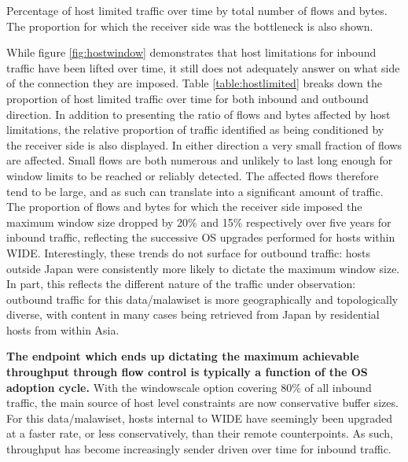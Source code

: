 \begin{table}\footnotesize
\centering
  \caption{\label{table:hostlimited}Percentage of host limited traffic over time by total number of flows and bytes. The proportion for which the receiver side was the bottleneck is also shown.}
\end{table}

While figure \ref{fig:hostwindow} demonstrates that host limitations for inbound traffic have been lifted over time, it still does not adequately answer on what side of the connection they are imposed.
Table \ref{table:hostlimited} breaks down the proportion of host limited traffic over time for both inbound and outbound direction.
In addition to presenting the ratio of flows and bytes affected by host limitations, the relative proportion of traffic identified as being conditioned by the receiver side is also displayed.
In either direction a very small fraction of flows are affected.
Small flows are both numerous and unlikely to last long enough for window limits to be reached or reliably detected.
The affected flows therefore tend to be large, and as such can translate into a significant amount of traffic.
The proportion of flows and bytes for which the receiver side imposed the maximum window size dropped by 20\% and 15\% respectively over five years for inbound traffic, reflecting the successive OS upgrades performed for hosts within WIDE. 
Interestingly, these trends do not surface for outbound traffic: hosts outside Japan were consistently more likely to dictate the maximum window size.
In part, this reflects the different nature of the traffic under observation: outbound traffic for this data/malawiset is more geographically and topologically diverse, with content in many cases being retrieved from Japan by residential hosts from within Asia.

\textbf{The endpoint which ends up dictating the maximum achievable throughput through flow control is typically a function of the OS adoption cycle.}
With the windowscale option covering 80\% of all inbound traffic, the main source of host level constraints are now conservative buffer sizes.
For this data/malawiset, hosts internal to WIDE have seemingly been upgraded at a faster rate, or less conservatively, than their remote counterpoints.
As such, throughput has become increasingly sender driven over time for inbound traffic.


